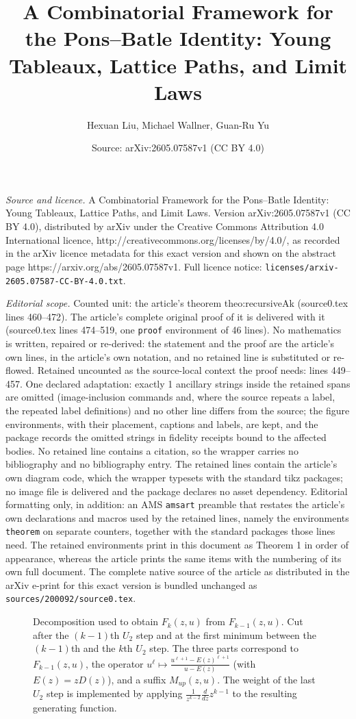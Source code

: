 \documentclass[10pt,a4paper]{amsart}
\title{A Combinatorial Framework for the Pons--Batle Identity: Young Tableaux, Lattice Paths, and Limit Laws}
\author{Hexuan Liu, Michael Wallner, Guan-Ru Yu}
\date{Source: arXiv:2605.07587v1 (CC BY 4.0)}
\newcommand{\Mup}{M_{up}}
\begin{document}
\maketitle

\noindent\emph{Source and licence.} A Combinatorial Framework for the Pons--Batle Identity: Young Tableaux, Lattice Paths, and Limit Laws. Version arXiv:2605.07587v1 (CC BY 4.0), distributed by arXiv under the Creative Commons Attribution 4.0 International licence, http://creativecommons.org/licenses/by/4.0/, as recorded in the arXiv licence metadata for this exact version and shown on the abstract page https://arxiv.org/abs/2605.07587v1. Full licence notice: \texttt{licenses/arxiv-2605.07587-CC-BY-4.0.txt}.\par\smallskip

\noindent\textit{Editorial scope.} Counted unit: the article's theorem theo:recursiveAk (source0.tex lines 460--472). The article's complete original proof of it is delivered with it (source0.tex lines 474--519, one \texttt{proof} environment of 46 lines). No mathematics is written, repaired or re-derived: the statement and the proof are the article's own lines, in the article's own notation, and no retained line is substituted or re-flowed.  Retained uncounted as the source-local context the proof needs: lines 449--457.  One declared adaptation: exactly 1 ancillary strings inside the retained spans are omitted (image-inclusion commands and, where the source repeats a label, the repeated label definitions) and no other line differs from the source; the figure environments, with their placement, captions and labels, are kept, and the package records the omitted strings in fidelity receipts bound to the affected bodies.  No retained line contains a citation, so the wrapper carries no bibliography and no bibliography entry.  The retained lines contain the article's own diagram code, which the wrapper typesets with the standard tikz packages; no image file is delivered and the package declares no asset dependency.  Editorial formatting only, in addition: an AMS \texttt{amsart} preamble that restates the article's own declarations and macros used by the retained lines, namely the environments \texttt{theorem} on separate counters, together with the standard packages those lines need.  The retained environments print in this document as Theorem 1 in order of appearance, whereas the article prints the same items with the numbering of its own full document.  The complete native source of the article as distributed in the arXiv e-print for this exact version is bundled unchanged as \texttt{sources/200092/source0.tex}.
\begin{figure}
  \centering
  
\caption{Decomposition used to obtain $F_k(z,u)$ from $F_{k-1}(z,u)$. 
Cut after the $(k-1)$th $U_2$ step and at the first minimum between the $(k-1)$th and the $k$th $U_2$ step. 
The three parts correspond to $F_{k-1}(z,u)$, the operator $u^\ell \mapsto \frac{u^{\ell+1}-E(z)^{\ell+1}}{u-E(z)}$ (with $E(z)=zD(z)$), and a suffix $\Mup(z,u)$. 
The weight of the last $U_2$ step is implemented by applying $\frac{1}{z^{k-2}}\frac{d}{dz}z^{k-1}$ to the resulting generating function.}
  \label{fig:decomposition_Fk}
\end{figure}
\end{document}

